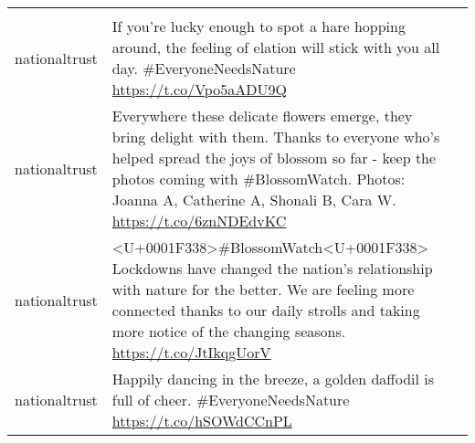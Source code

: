 \documentclass[
]{article}
\begin{document}
\begin{longtable}[]{@{}llr@{}}
\begin{minipage}[t]{0.21\columnwidth}
\end{minipage}\tabularnewline
\begin{minipage}[t]{0.22\columnwidth}\raggedright
nationaltrust\strut
\end{minipage} & \begin{minipage}[t]{0.49\columnwidth}\raggedright
If you're lucky enough to spot a hare hopping around, the feeling of
elation will stick with you all day. \#EveryoneNeedsNature
\url{https://t.co/Vpo5aADU9Q}\strut
\end{minipage} & \begin{minipage}[t]{0.21\columnwidth}\raggedleft
698\strut
\end{minipage}\tabularnewline
\begin{minipage}[t]{0.22\columnwidth}\raggedright
nationaltrust\strut
\end{minipage} & \begin{minipage}[t]{0.49\columnwidth}\raggedright
Everywhere these delicate flowers emerge, they bring delight with them.
Thanks to everyone who's helped spread the joys of blossom so far - keep
the photos coming with \#BlossomWatch. Photos: Joanna A, Catherine A,
Shonali B, Cara W. \url{https://t.co/6znNDEdvKC}\strut
\end{minipage} & \begin{minipage}[t]{0.21\columnwidth}\raggedleft
692\strut
\end{minipage}\tabularnewline
\begin{minipage}[t]{0.22\columnwidth}\raggedright
nationaltrust\strut
\end{minipage} & \begin{minipage}[t]{0.49\columnwidth}\raggedright
\textless U+0001F338\textgreater\#BlossomWatch\textless U+0001F338\textgreater{}
Lockdowns have changed the nation's relationship with nature for the
better. We are feeling more connected thanks to our daily strolls and
taking more notice of the changing seasons.
\url{https://t.co/JtIkqgUorV}\strut
\end{minipage} & \begin{minipage}[t]{0.21\columnwidth}\raggedleft
565\strut
\end{minipage}\tabularnewline
\begin{minipage}[t]{0.22\columnwidth}\raggedright
nationaltrust\strut
\end{minipage} & \begin{minipage}[t]{0.49\columnwidth}\raggedright
Happily dancing in the breeze, a golden daffodil is full of cheer.
\#EveryoneNeedsNature \url{https://t.co/hSOWdCCnPL}\strut

\end{minipage}
\end{longtable}
\end{document}
